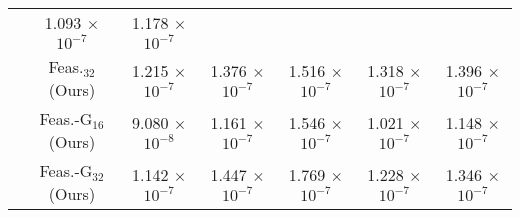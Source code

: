 \begin{table*}[t]
{\begin{tabular}{ccccccc}
& 1.093  \(\times\) \(10^{-7}\) & 1.178  \(\times\) \(10^{-7}\) \\
& Feas.$_{32}$ (Ours) & 1.215  \(\times\) \(10^{-7}\) & 1.376  \(\times\) \(10^{-7}\) & 1.516  \(\times\) \(10^{-7}\)
& 1.318  \(\times\) \(10^{-7}\) & 1.396  \(\times\) \(10^{-7}\) \\
& Feas.-G$_{16}$ (Ours) & 9.080  \(\times\) \(10^{-8}\) & 1.161  \(\times\) \(10^{-7}\) & 1.546  \(\times\) \(10^{-7}\)
& 1.021  \(\times\) \(10^{-7}\) & 1.148  \(\times\) \(10^{-7}\) \\
& Feas.-G$_{32}$ (Ours) & 1.142  \(\times\) \(10^{-7}\) & 1.447  \(\times\) \(10^{-7}\) & 1.769  \(\times\) \(10^{-7}\)
& 1.228  \(\times\) \(10^{-7}\) & 1.346  \(\times\) \(10^{-7}\) \\

\bottomrule

\end{tabular}
}
\end{table*}


 




